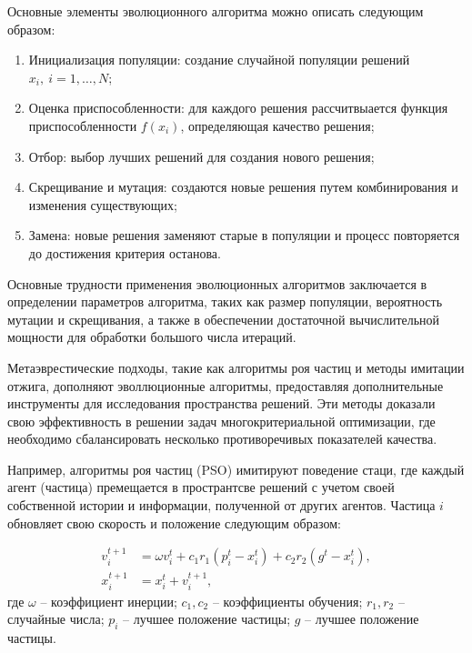 Основные элементы эволюционного алгоритма можно описать следующим образом:

\begin{enumerate}
    \item Инициализация популяции: создание случайной популяции решений $x_i,~i = 1, \ldots, N$;
    \item Оценка приспособленности: для каждого решения рассчитвыается функция приспособленности $f(x_i)$,
          определяющая качество решения;
    \item Отбор: выбор лучших решений для создания нового решения;
    \item Скрещивание и мутация: создаются новые решения путем комбинирования и изменения существующих;
    \item Замена: новые решения заменяют старые в популяции и процесс повторяется до достижения критерия останова.
\end{enumerate}

Основные трудности применения эволюционных алгоритмов заключается
в определении параметров алгоритма, таких как размер популяции, вероятность мутации и
скрещивания, а также в обеспечении достаточной вычислительной мощности для
обработки большого числа итераций.

Метаэврестические подходы, такие как алгоритмы роя частиц и методы имитации отжига,
дополняют эволлюционные алгоритмы, предоставляя дополнительные инструменты для
исследования пространства решений. Эти методы доказали свою эффективность в
решении задач многокритериальной оптимизации, где необходимо сбалансировать
несколько противоречивых показателей качества.

Например, алгоритмы роя частиц (PSO) имитируют поведение стаци, где каждый
агент (частица) премещается в пространтсве решений с учетом своей собственной
истории и информации, полученной от других агентов. Частица $i$ обновляет
свою скорость и положение следующим образом:

\begin{equation}
    \begin{aligned}
        v_i^{t+1} & = \omega v_i^t + c_1 r_1 (p_i^t - x_i^t) + c_2 r_2 (g^t - x_i^t), \\
        x_i^{t+1} & = x_i^t + v_i^{t+1},
    \end{aligned}
\end{equation}
где $\omega$ -- коэффициент инерции;
$c_1, c_2$ -- коэффициенты обучения;
$r_1, r_2$ -- случайные числа;
$p_i$ -- лучшее положение частицы;
$g$ -- лучшее положение частицы.

